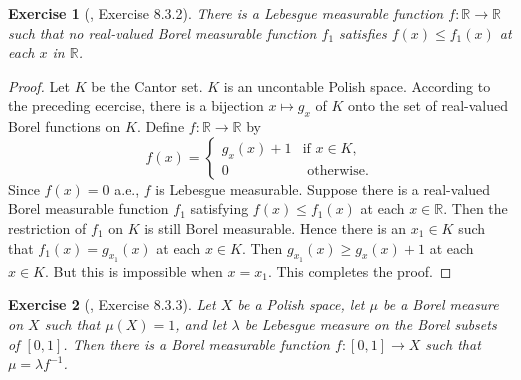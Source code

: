 \documentclass[11pt]{article}
\theoremstyle{plain}
\newtheorem{exercise}{Exercise}
\theoremstyle{definition}
\theoremstyle{remark}
\begin{document}
\begin{exercise}[\cite{book:992991}, Exercise 8.3.2]
    There is a Lebesgue measurable function $f: \mathbb R \to \mathbb R$ such that no real-valued Borel measurable function $f_1$ satisfies $f(x) \leq f_1(x)$ at each $x$ in $\mathbb R$.
\end{exercise}
\begin{proof}
    Let $K$ be the Cantor set. 
    $K$ is an uncontable Polish space.
    According to the preceding ecercise, there is a bijection $x \mapsto g_x$ of $K$ onto the set of real-valued Borel functions on $K$.
    Define $f: \mathbb R \to \mathbb R$ by
    \begin{equation*}
        f(x)=
        \left\{
            \begin{array}{ll}
                g_x(x)+1 & \text{if }x \in K,
                \\
                0 & \text{ otherwise}.
            \end{array}
    \right.
    \end{equation*}
    Since $f(x) = 0$ a.e.\@, $f$ is Lebesgue measurable.
    Suppose there is a real-valued Borel measurable function $f_1$ satisfying $f(x) \leq f_1(x)$ at each $x \in \mathbb R$.
    Then the restriction of $f_1$ on $K$ is still Borel measurable.
    Hence there is an $x_1\in K$ such that $f_1(x)=g_{x_1}(x)$ at each $x \in K$.
    Then $g_{x_1}(x) \geq g_x(x) +1 $ at each $x \in K$.
    But this is impossible when $x= x_1$.
    This completes the proof.

\end{proof}
\begin{exercise}[\cite{book:992991}, Exercise 8.3.3]
    Let $X$ be a Polish space, let $\mu$ be a Borel measure on $X$ such that $\mu(X) = 1$, and let $\lambda$ be Lebesgue measure on the Borel subsets of $[0,1]$.
    Then there is a Borel measurable function $f: [0,1]\to X$ such that $\mu= \lambda f^{-1}$.
\end{exercise}
\end{document}
